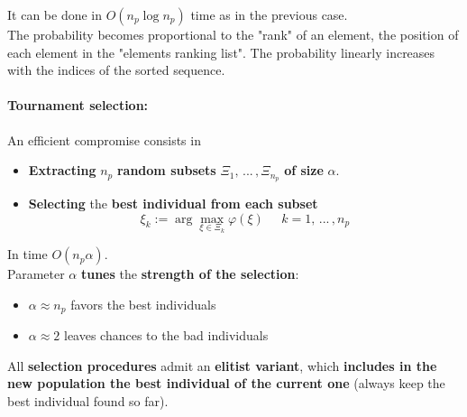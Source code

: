 It can be done in $O (n_p \log n_p )$ time as in the previous case.\\

The probability becomes proportional to the "rank" of an element, the position of each element in the "elements ranking list". The probability linearly increases with the indices of the sorted sequence.\\

\newpage

\paragraph{Tournament selection:} An efficient compromise consists in
\begin{itemize}
	\item \textbf{Extracting} $n_p$ \textbf{random subsets} $\Xi_1, \, ... \, , \Xi_{n_p}$ \textbf{of size} $\alpha$.\\
	
	\item \textbf{Selecting} the \textbf{best individual from each subset}
	$$ \xi_k := \arg \max_{\xi \in \Xi_k} \varphi (\xi) \;\;\;\;\; k = 1, \, ... \, , n_p $$
\end{itemize}
\nn

In time $O (n_p \alpha)$.\\

Parameter $\alpha$ \textbf{tunes} the \textbf{strength of the selection}:
\begin{itemize}
	\item $\alpha \approx n_p$ favors the best individuals
	\item $\alpha \approx 2$ leaves chances to the bad individuals
\end{itemize} 

\nn \nn

All \textbf{selection procedures} admit an \textbf{elitist variant}, which \textbf{includes in the new population the best individual of the current one} (always keep the best individual found so far).\\


\newpage

